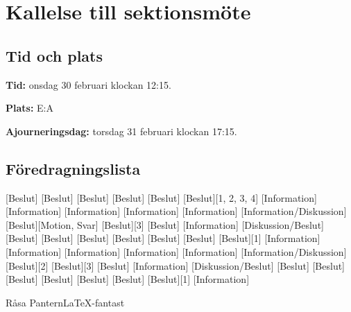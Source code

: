 \documentclass{dseknotice}
\begin{document}
\setdate{\today}

\section*{Kallelse till sektionsmöte \usemeeting}
\subsection*{Tid och plats}
\textbf{Tid:} onsdag 30 februari klockan 12:15.

\textbf{Plats:} E:A

\textbf{Ajourneringsdag:} torsdag 31 februari klockan 17:15.

\subsection*{Föredragningslista}
\begin{agenda}
    [Beslut]
    [Beslut]
    [Beslut]
    [Beslut]
    [Beslut]
    [Beslut][1, 2, 3, 4]
    [Information]
    [Information]
    [Information]
    [Information]
    [Information]
    [Information/Diskussion]
    [Beslut][Motion, Svar]
    [Beslut][3]
    [Beslut]
    [Information]
    [Diskussion/Beslut]
    [Beslut]
    [Beslut]
    [Beslut]
    [Beslut]
    [Beslut]
    [Beslut]
    [Beslut][1]
    [Information]
    [Information]
    [Information]
    [Information]
    [Information]
    [Information/Diskussion]
    [Beslut][2]
    [Beslut][3]
    [Beslut]
    [Information]
    [Diskussion/Beslut]
    [Beslut]
    [Beslut]
    [Beslut]
    [Beslut]
    [Beslut]
    [Beslut]
    [Beslut][1]
    [Information]
\end{agenda}

\medskip

\signature{För D-sektionen, dag som ovan}{Råsa Pantern}{\LaTeX-fantast}
\end{document}
